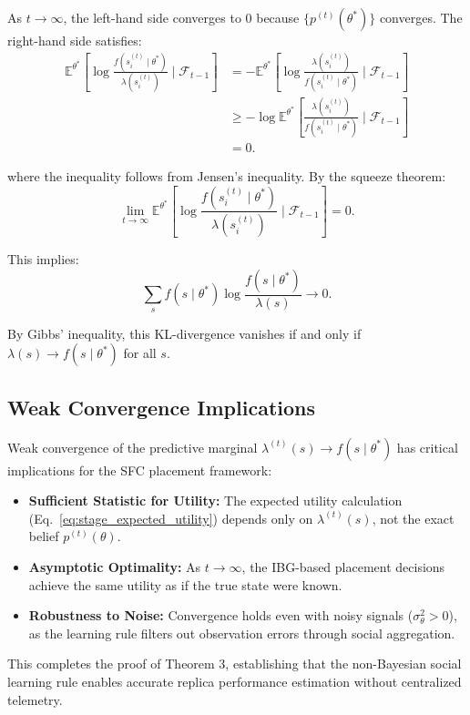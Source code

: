 \documentclass[journal]{IEEEtran}
\theoremstyle{plain}
\theoremstyle{definition}
\theoremstyle{remark}
\begin{document}
As $t \to \infty$, the left-hand side converges to 0 because $\{p^{(t)}(\theta^*)\}$ converges. The right-hand side satisfies:
\begin{align}
\mathbb{E}^{\theta^*}\left[\log \frac{f(s_i^{(t)} \mid \theta^*)}{\lambda(s_i^{(t)})} \mid \mathcal{F}_{t-1}\right]
&= -\mathbb{E}^{\theta^*}\left[\log \frac{\lambda(s_i^{(t)})}{f(s_i^{(t)} \mid \theta^*)} \mid \mathcal{F}_{t-1}\right] \nonumber \\
&\ge -\log \mathbb{E}^{\theta^*}\left[ \frac{\lambda(s_i^{(t)})}{f(s_i^{(t)} \mid \theta^*)} \mid \mathcal{F}_{t-1}\right] \nonumber \\
&= 0.
\end{align}

where the inequality follows from Jensen's inequality. By the squeeze theorem:
\begin{equation}
\lim_{t \to \infty} \mathbb{E}^{\theta^*}\left[\log \frac{f(s_i^{(t)} \mid \theta^*)}{\lambda(s_i^{(t)})} \mid \mathcal{F}_{t-1}\right] = 0.
\end{equation}

This implies:
\begin{equation}
\sum_s f(s \mid \theta^*) \log \frac{f(s \mid \theta^*)}{\lambda(s)} \to 0.
\end{equation}

By Gibbs' inequality, this KL-divergence vanishes if and only if $\lambda(s) \to f(s \mid \theta^*)$ for all $s$.

\subsection{Weak Convergence Implications}
\label{app:proof_thm3_sec4}

Weak convergence of the predictive marginal $\lambda^{(t)}(s) \to f(s \mid \theta^*)$ has critical implications for the SFC placement framework:
\begin{itemize}
    \item \textbf{Sufficient Statistic for Utility:} The expected utility calculation (Eq.~\eqref{eq:stage_expected_utility}) depends only on $\lambda^{(t)}(s)$, not the exact belief $p^{(t)}(\theta)$.
    \item \textbf{Asymptotic Optimality:} As $t \to \infty$, the IBG-based placement decisions achieve the same utility as if the true state were known.
    \item \textbf{Robustness to Noise:} Convergence holds even with noisy signals ($\sigma_\theta^2 > 0$), as the learning rule filters out observation errors through social aggregation.
\end{itemize}

This completes the proof of Theorem 3, establishing that the non-Bayesian social learning rule enables accurate replica performance estimation without centralized telemetry.
\end{document}
